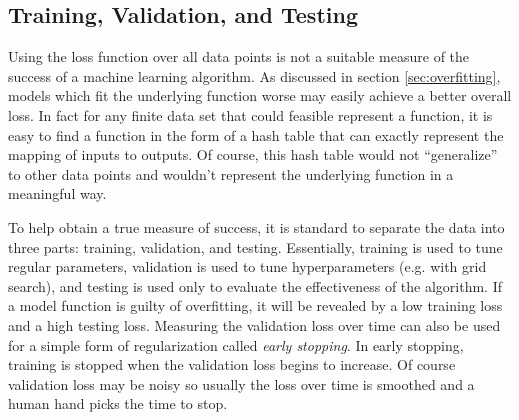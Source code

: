 \subsection{Training, Validation, and Testing}
Using the loss function over all data points is not a suitable measure of the success of a machine learning algorithm.  As discussed in section \ref{sec:overfitting}, models which fit the underlying function worse may easily achieve a better overall loss.  In fact for any finite data set that could feasible represent a function, it is easy to find a function in the form of a hash table that can exactly represent the mapping of inputs to outputs.  Of course, this hash table would not ``generalize'' to other data points and wouldn't represent the underlying function in a meaningful way.  

To help obtain a true measure of success, it is standard to separate the data into three parts: training, validation, and testing.  Essentially, training is used to tune regular parameters, validation is used to tune hyperparameters (e.g. with grid search), and testing is used only to evaluate the effectiveness of the algorithm.  If a model function is guilty of overfitting, it will be revealed by a low training loss and a high testing loss.  Measuring the validation loss over time can also be used for a simple form of regularization called \textit{early stopping}.  In early stopping, training is stopped when the validation loss begins to increase.  Of course validation loss may be noisy so usually the loss over time is smoothed and a human hand picks the time to stop.
